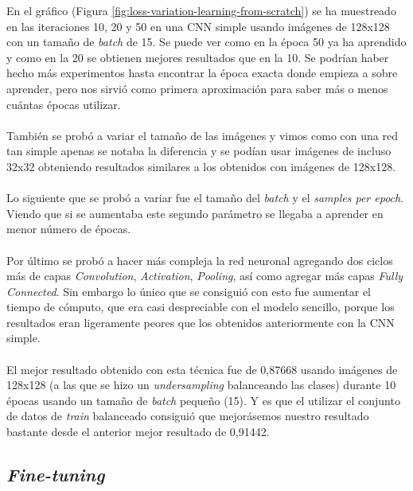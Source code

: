 En el gráfico (Figura \ref{fig:loss-variation-learning-from-scratch}) se ha muestreado en las iteraciones 10, 20 y 50 en una CNN simple usando imágenes de 128x128 con un tamaño de \textit{batch} de 15. Se puede ver como en la época 50 ya ha aprendido y como en la 20 se obtienen mejores resultados que en la 10. Se podrían haber hecho más experimentos hasta encontrar la época exacta donde empieza a sobre aprender, pero nos sirvió como primera aproximación para saber más o menos cuántas épocas utilizar.
\\ \\
También se probó a variar el tamaño de las imágenes y vimos como con una red tan simple apenas se notaba la diferencia y se podían usar imágenes de incluso 32x32 obteniendo resultados similares a los obtenidos con imágenes de 128x128.
\\ \\
Lo siguiente que se probó a variar fue el tamaño del \textit{batch} y el \textit{samples per epoch}. Viendo que si se aumentaba este segundo parámetro se llegaba a aprender en menor número de épocas.
\\ \\
Por último se probó a hacer más compleja la red neuronal agregando dos ciclos más de capas \textit{Convolution}, \textit{Activation}, \textit{Pooling}, así como agregar más capas \textit{Fully Connected}. Sin embargo lo único que se consiguió con esto fue aumentar el tiempo de cómputo, que era casi despreciable con el modelo sencillo, porque los resultados eran ligeramente peores que los obtenidos anteriormente con la CNN simple.
\\ \\
El mejor resultado obtenido con esta técnica fue de 0,87668	usando imágenes de 128x128 (a las que se hizo un \textit{undersampling} balanceando las clases) durante 10 épocas usando un tamaño de \textit{batch} pequeño (15). Y es que el utilizar el conjunto de datos de \textit{train} balanceado consiguió que mejorásemos nuestro resultado bastante desde el anterior mejor resultado de 0,91442.

\subsection{\textit{Fine-tuning}}

